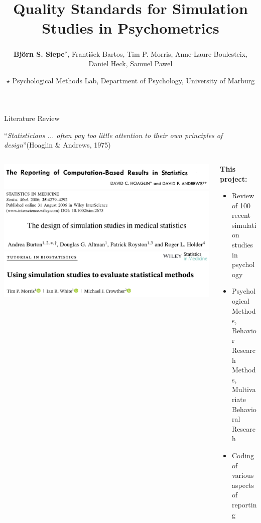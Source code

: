 \documentclass[english, 12pt, aspectratio=169]{beamer}
\date{$\star$ Psychological Methods Lab, Department of Psychology, University of Marburg}
\title{~\\ ~ \\ \textbf{Quality Standards for Simulation Studies in Psychometrics}}
\author{\textbf{Björn S. Siepe}\textsuperscript{$\star$}, František Bartos, Tim P. Morris, Anne-Laure Boulesteix, Daniel Heck, Samuel Pawel}
\institute{
  IMPS 2024. Slides available at \url{htpps://bsiepe.github.io}
}
\begin{document}


\begin{frame}
   \titlepage
 \nocite{PawelKookReeve2023}
 \end{frame}





\begin{frame}{Literature Review}
\begin{tcolorbox}[colframe=chineseBlue]
            ``\emph{Statisticians ... often pay too little attention to their own principles of design}''(Hoaglin \& Andrews, 1975)
          \end{tcolorbox}
          \vspace{-1em}
  \begin{columns}
    \begin{column}{0.5\textwidth}
      \begin{block}{}
          \centering
          \includegraphics[width = 0.8\linewidth,frame]{pics/hoaglin.png}
          \includegraphics[width = 0.8\linewidth,frame]{pics/burton.png}
          \includegraphics[width = 0.8\linewidth,frame]{pics/morris.png}
          \nocite{Hoaglin1975}
          \pause
      \end{block}
    \end{column}
    \begin{column}{0.5\textwidth}
      \begin{block}{}
      \textbf{This project:}
      \pause
        \begin{itemize}
          \item Review of \alert{100 recent simulation studies} in psychology
          \pause
          \item Psychological Methods, Behavior Research Methods, Multivariate Behavioral Research
          \pause
          \item Coding of various aspects of reporting
        \end{itemize}
      \end{block}
      \end{column}
    \end{columns}
\end{frame}
\end{document}
